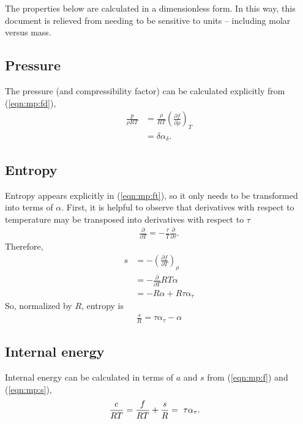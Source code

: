 The properties below are calculated in a dimensionless form.  In this way, this document is relieved from needing to be sensitive to units -- including molar versus mass. 
 
\subsection{Pressure}\label{sec:mp1:p}

The pressure (and compressibility factor) can be calculated explicitly from (\ref{eqn:mp:fd}),
\begin{align}
\frac{p}{\rho R T} &=  \frac{\rho}{R T}\left(\frac{\partial f}{\partial \rho}\right)_T\nonumber\\
&= \delta \alpha_\delta\label{eqn:mp:p}.
\end{align}

\subsection{Entropy}\label{sec:mp1:s}

Entropy appears explicitly in (\ref{eqn:mp:ft}), so it only needs to be transformed into terms of $\alpha$.  First, it is helpful to observe that derivatives with respect to temperature may be transposed into derivatives with respect to $\tau$ 
\begin{align}
\frac{\partial}{\partial T} = -\frac{\tau}{T} \frac{\partial}{\partial \tau}.\nonumber
\end{align}
Therefore, 
\begin{align}
s &= -\left(\frac{\partial f}{\partial T}\right)_\rho \nonumber\\
&= -\frac{\partial}{\partial T} R T \alpha\nonumber\\
&= -R \alpha + R \tau \alpha_\tau
\end{align}
So, normalized by $R$, entropy is
\begin{align}
\frac{s}{R} = \tau \alpha_\tau - \alpha\label{eqn:mp:s}
\end{align}

\subsection{Internal energy}\label{sec:mp1:e}

Internal energy can be calculated in terms of $a$ and $s$ from (\ref{eqn:mp:f}) and (\ref{eqn:mp:s}),
\begin{align}
\frac{e}{R T} &= \frac{f}{RT} + \frac{s}{R} \vspace{2em} =\ \tau \alpha_\tau\label{eqn:mp:e}.
\end{align}

